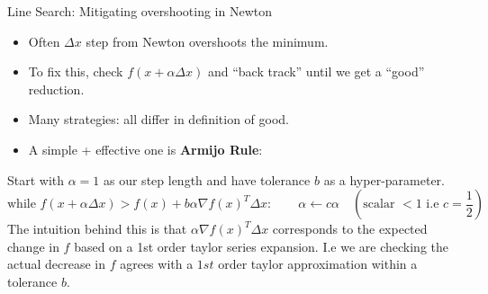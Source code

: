 \begin{frame}{Line Search: Mitigating overshooting in Newton}
\begin{itemize}
    \item Often $\Delta x$ step from Newton overshoots the minimum.
    \item To fix this, check $f(x + \alpha \Delta x)$ and “back track” until we get a “good” reduction.
    \item Many strategies: all differ in definition of good. 
    \item A simple + effective one is \textbf{Armijo Rule}:
\end{itemize} 

Start with $\alpha=1$ as our step length and have tolerance $b$ as a hyper-parameter.
 $$
\text{while } f(x + \alpha \Delta x) > f(x) + b \alpha \nabla f(x)^T \Delta x: \quad \quad  \alpha \leftarrow c \alpha \quad (\text{scalar } < 1 \text{ i.e } c =\frac{1}{2}) 
$$ 
\footnotesize
The intuition behind this is that $\alpha \nabla f(x)^T \Delta x$ corresponds to the expected change in $f$ based on a 1st order taylor series expansion. I.e we are checking the actual decrease in $f$ agrees with a $1st$ order taylor approximation within a tolerance $b$.
    
\end{frame}